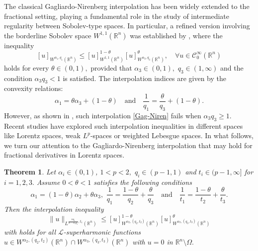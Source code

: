 \documentclass[12pt]{amsart}
\newcommand{\R}{\mathbb{R}}
\newcommand{\be}{\begin{equation}}
\newcommand{\ee}{\end{equation}}
\numberwithin{equation}{section}
\theoremstyle{plain}
\newtheorem{Thm}{Theorem}[section]
\theoremstyle{definition}
\theoremstyle{remark}
\begin{document}
The classical Gagliardo-Nirenberg interpolation has been widely extended to the fractional setting, playing a fundamental role in the study of intermediate regularity between Sobolev-type spaces. In particular, a refined version involving the borderline Sobolev space  $W^{1,1}(\R^{n})$ was established by \cite{Cohen03}, where the inequality
\be\label{Gag-Niren}
[u]_{W^{\alpha_{1},{q_{1}}}(\R^{n})} \leq [u]_{W^{1,{1}}(\R^{n})}^{1-\theta} [u]_{W^{\alpha_{3},{q_{3}}}(\R^{n})}^{\theta},\quad\forall u\in\mathcal{C}_{0}^{\infty}(\R^{n})
\ee
holds for every $\theta\in(0,1),$ provided that $ \alpha_{3}\in(0,1),$ $q_{3}\in(1,\infty)$ and the condition $\alpha_{3}q_{3}<1$ is satisfied. The interpolation indices are given by the convexity relations:
\[
\alpha_{1}=\theta\alpha_{3}+(1-\theta)\quad\text{and}\quad\frac{1}{q_{1}}=\frac{\theta}{q_{3}}+(1-\theta).
\]
However, as shown in \cite{BM2018}, such interpolation \eqref{Gag-Niren} fails when $\alpha_{3}q_{3}\geq 1.$ Recent studies \cite{BSY} have explored such interpolation inequalities in different spaces like Lorentz spaces, weak $L^{p}$-spaces or weighted Lebesgue spaces. In what follows, we turn our attention to the Gagliardo-Nirenberg interpolation that may hold for fractional derivatives in Lorentz spaces. 
\begin{Thm}\label{interpolation}
Let $\alpha_{i}\in(0,1)$, $1<p<2,$ $q_{i}\in(p-1,1)$ and $t_{i}\in(p-1, \infty]$ for $i=1,2,3.$ Assume $0<\theta<1$ satisfies the following conditions
\[
\alpha_{1}=(1-\theta)\alpha_{2}+\theta\alpha_{3},\,\,\frac{1}{q_{1}}=\frac{1-\theta}{q_{2}}+\frac{\theta}{q_{3}}\quad\text{and}\quad \frac{1}{t_{1}}=\frac{1-\theta}{t_{2}}+\frac{\theta}{t_{3}}.
\]
Then the interpolation inequality
\[
\|u\|_{L^{\frac{nq_{1}}{n-\alpha_{1} q_{1}},t_{1}}(\R^{n})}\leq [u]_{W^{\alpha_{2},{(q_{2},t_{2})}}(\R^{n})}^{1-\theta} [u]_{W^{\alpha_{3},{(q_{3},t_{3})}}(\R^{n})}^{\theta}
\]
with holds for all $\mathcal{L}$-superharmonic functions $u\in W^{\alpha_{2},(q_{2},t_{2})}(\R^{n})\cap W^{\alpha_{3},(q_{3},t_{3})}(\R^{n})$ with $u=0$ in $\R^{n}\setminus\Omega.$
\end{Thm}
\end{document}
